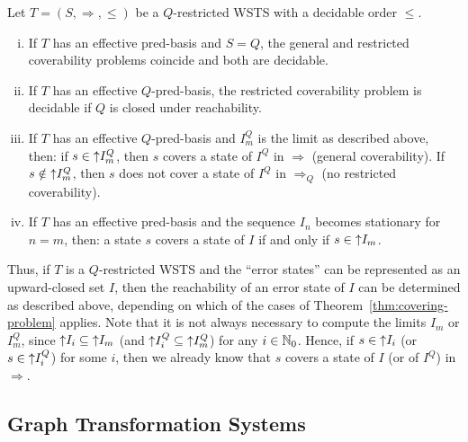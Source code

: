 \documentclass{llncs}
\begin{document}
\newcommand{\thmCoveringProblem}{
  Let $T = (S, \Rightarrow, \leq)$ be a $Q$-restricted WSTS with a
  decidable order $\leq$.
  \begin{enumerate}[(i)]
  \item \label{thm:covering-problem:case-all} If $T$ has an effective
    pred-basis and $S = Q$, the general and restricted coverability
    problems coincide and both are decidable.
  \item \label{thm:covering-problem:case-special} If $T$ has an
    effective $Q$-pred-basis, the restricted coverability problem is
    decidable if $Q$ is closed under reachability.
  \item \label{thm:covering-problem:case-general} If $T$ has an
    effective $Q$-pred-basis and $I^Q_m$ is the limit as described
    above, then: if $s \in \upclosed{I^Q_m}$, then $s$ covers a state
    of $I^Q$ in $\Rightarrow$ (general coverability). If $s \notin
    \upclosed{I^Q_m}$, then $s$ does not cover a state of $I^Q$ in
    $\Rightarrow_Q$ (no restricted coverability).
  \item \label{thm:covering-problem:case-hope} If $T$ has an effective
    pred-basis and the sequence $I_n$ becomes stationary for $n=m$,
    then: a state $s$ covers a state of $I$ if and only if $s \in
    \upclosed{I_m}$.
  \end{enumerate}
}
\newcommand{\thmCoveringProblemTitle}{Coverability problems}
\begin{theorem}[\thmCoveringProblemTitle]\label{thm:covering-problem}
  \thmCoveringProblem
\end{theorem}

Thus, if $T$ is a $Q$-restricted WSTS and the ``error states'' can be
represented as an upward-closed set $I$, then the reachability of an
error state of $I$ can be determined as described above, depending on
which of the cases of Theorem~\ref{thm:covering-problem} applies.
Note that it is not always necessary to compute the limits $I_m$ or
$I^Q_m$, since $\mathord{\uparrow} I_i \subseteq \mathord{\uparrow} I_m$ (and
$\mathord{\uparrow} I_i^Q \subseteq \mathord{\uparrow} I_m^Q$) for any $i \in \mathbb{N}_0$.
Hence, if $s \in \mathord{\uparrow} I_i$ (or $s \in \mathord{\uparrow} I_i^Q$) for
some $i$, then we already know that $s$ covers a state of $I$ (or of
$I^Q$) in $\Rightarrow$.

\subsection{Graph Transformation Systems}\label{sec:gts}
\end{document}
